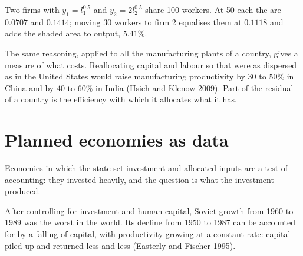 \begin{omfigure}

{\small Two firms with $y_1 = l_1^{0.5}$ and $y_2 = 2l_2^{0.5}$ share 100 workers. At 50 each the
 are $0.0707$ and $0.1414$; moving 30 workers to firm 2
equalises them at $0.1118$ and adds the shaded area to output, $5.41\%$.}
\end{omfigure}

The same reasoning, applied to all the manufacturing plants of a country,
gives a measure of what  costs. Reallocating capital and
labour so that  were as dispersed as in the United States
would raise manufacturing productivity by $30$ to $50\%$ in China and by $40$ to
$60\%$ in India (Hsieh and Klenow 2009). %
Part of the residual of a country is the efficiency with which it
allocates what it has.

\section{Planned economies as data}\label{sec:b1:growth-accounting:planned}

Economies in which the state set investment and allocated inputs are a
test of accounting: they invested heavily, and the question is what the
investment produced.

\begin{record}
After controlling for investment and human capital, Soviet growth from
1960 to 1989 was the worst in the world. Its decline from 1950 to 1987 can
be accounted for by a falling  of capital, with
productivity growing at a constant rate: capital piled up and returned
less and less (Easterly and Fischer 1995). %
\end{record}

